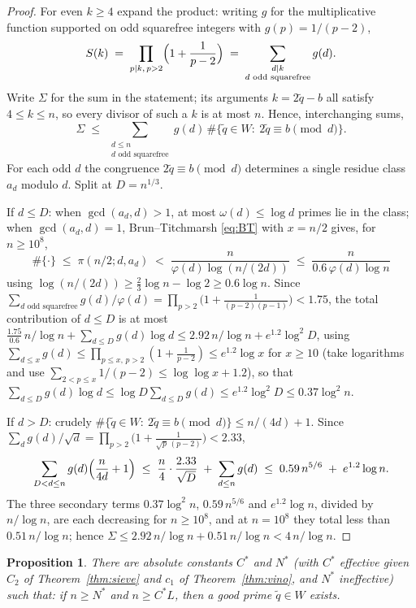 \documentclass[11pt]{amsart}
\numberwithin{equation}{section}
\newtheorem{proposition}[theorem]{Proposition}
\theoremstyle{remark}
\begin{document}
\begin{proof}
For even $k\ge 4$ expand the product: writing $g$ for the multiplicative function
supported on odd squarefree integers with $g(p)=1/(p-2)$,
\[
S(k)\;=\;\prod_{p\mid k,\,p>2}\Bigl(1+\frac1{p-2}\Bigr)
\;=\;\sum_{\substack{d\mid k\\ d \text{ odd squarefree}}} g(d) .
\]
Write $\Sigma$ for the sum in the statement; its arguments $k=2\tilde q-b$ all
satisfy $4\le k\le n$, so every divisor of such a $k$ is at most $n$. Hence,
interchanging sums,
\[
\Sigma
\;\le\;\sum_{\substack{d\le n\\ d \text{ odd squarefree}}} g(d)\,
\#\{\tilde q\in W:\ 2\tilde q\equiv b \pmod d\}.
\]
For each odd $d$ the congruence $2\tilde q\equiv b\pmod d$ determines a single
residue class $a_d$ modulo $d$. Split at $D=n^{1/3}$.

If $d\le D$: when $\gcd(a_d,d)>1$, at most $\omega(d)\le\log d$ primes lie in the
class; when $\gcd(a_d,d)=1$, Brun--Titchmarsh \eqref{eq:BT} with $x=n/2$ gives,
for $n\ge 10^8$,
\[
\#\{\cdot\}\;\le\;\pi(n/2;d,a_d)\;<\;\frac{n}{\varphi(d)\log(n/(2d))}
\;\le\;\frac{n}{0.6\,\varphi(d)\log n}
\]
using $\log(n/(2d))\ge\tfrac23\log n-\log2\ge0.6\log n$. Since
$\sum_{d \text{ odd squarefree}} g(d)/\varphi(d)
=\prod_{p>2}\bigl(1+\tfrac1{(p-2)(p-1)}\bigr)<1.75$,
the total contribution of $d\le D$ is at most
$\tfrac{1.75}{0.6}\,n/\log n+\sum_{d\le D}g(d)\log d
\le 2.92\,n/\log n+e^{1.2}\log^2\!D$,
using $\sum_{d\le x}g(d)\le\prod_{p\le x,\,p>2}(1+\tfrac1{p-2})\le e^{1.2}\log x$
for $x\ge 10$ (take logarithms and use
$\sum_{2<p\le x}1/(p-2)\le\log\log x+1.2$), so that
$\sum_{d\le D}g(d)\log d\le \log D\sum_{d\le D}g(d)\le e^{1.2}\log^2\!D
\le0.37\log^2 n$.

If $d>D$: crudely $\#\{\tilde q\in W:\ 2\tilde q\equiv b\pmod d\}\le n/(4d)+1$.
Since $\sum_d g(d)/\sqrt d=\prod_{p>2}\bigl(1+\tfrac1{\sqrt p\,(p-2)}\bigr)<2.33$,
\[
\sum_{D<d\le n}g(d)\Bigl(\frac n{4d}+1\Bigr)
\;\le\;\frac n4\cdot\frac{2.33}{\sqrt D}\;+\;\sum_{d\le n}g(d)
\;\le\;0.59\,n^{5/6}\;+\;e^{1.2}\log n .
\]
The three secondary terms $0.37\log^2n$, $0.59\,n^{5/6}$ and $e^{1.2}\log n$,
divided by $n/\log n$, are each decreasing for $n\ge10^8$, and at $n=10^8$ they
total less than $0.51\,n/\log n$; hence
$\Sigma\le 2.92\,n/\log n+0.51\,n/\log n<4\,n/\log n$.
\end{proof}

\begin{proposition}\label{prop:good}
There are absolute constants $C^*$ and $N^*$ (with $C^*$ effective given $C_2$ of
Theorem~\ref{thm:sieve} and $c_1$ of Theorem~\ref{thm:vino}, and $N^*$
ineffective) such that: if $n\ge N^*$ and $n\ge C^*L$, then a good prime
$\tilde q\in W$ exists.
\end{proposition}
\end{document}
